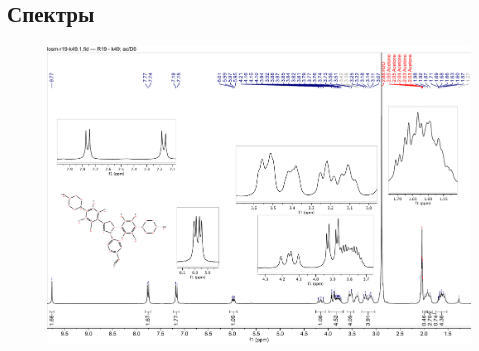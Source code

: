 \begin{appendices}

    \section{Спектры}

        \begin{figure}
            \centering
            \includegraphics[scale=0.2]{appendix/img/r19-1h.pdf}
            \caption{}
        \end{figure}



\end{appendices}
